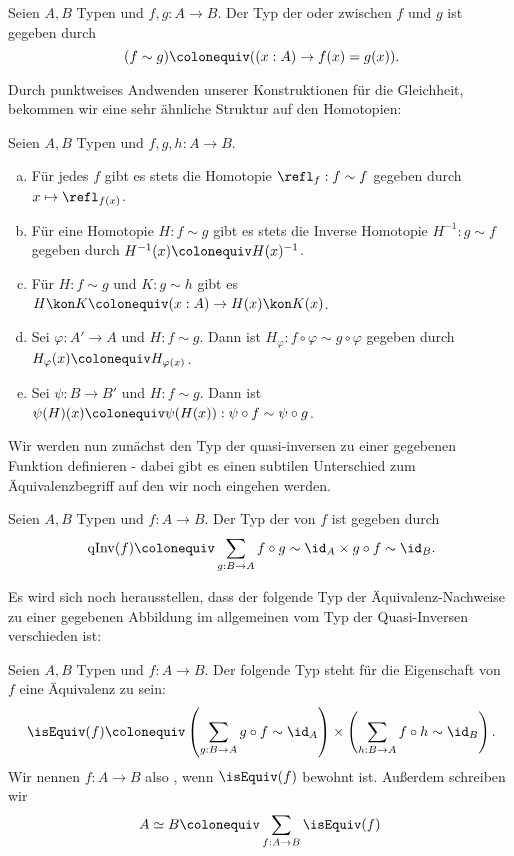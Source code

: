 \begin{definition}
  Seien $A,B$ Typen und $f,g:A\to B$.
  Der Typ der 
  oder  zwischen $f$ und $g$
  ist gegeben durch
  \[
    (f\sim g)\colonequiv( (x:A)\to f(x)=g(x))\rlap{.}
  \]
\end{definition}

Durch punktweises Andwenden unserer Konstruktionen für die Gleichheit,
bekommen wir eine sehr ähnliche Struktur auf den Homotopien:

\begin{definition}
  Seien $A,B$ Typen und $f,g,h:A\to B$.
  \begin{enumerate}[(a)]
  \item Für jedes $f$ gibt es stets die Homotopie $\refl_f:f\sim f$ gegeben durch $x\mapsto \refl_{f(x)}$.
  \item Für eine Homotopie $H:f\sim g$ gibt es stets die Inverse Homotopie $H^{-1}:g\sim f$ gegeben durch $H^{-1}(x)\colonequiv H(x)^{-1}$.
  \item Für $H:f\sim g$ und $K:g\sim h$ gibt es $H\kon K\colonequiv (x:A)\to H(x)\kon K(x)$.
  \item Sei $\varphi:A'\to A$ und $H:f\sim g$.
    Dann ist $H_\varphi:f\circ \varphi \sim g\circ \varphi$ gegeben durch $H_\varphi(x)\colonequiv H_{\varphi(x)}$.
  \item Sei $\psi:B\to B'$ und $H:f\sim g$. Dann ist $\psi(H)(x)\colonequiv \psi(H(x)):\psi\circ f\sim\psi\circ g$.
  \end{enumerate}
\end{definition}

Wir werden nun zunächst den Typ der quasi-inversen zu einer gegebenen Funktion definieren
- dabei gibt es einen subtilen Unterschied zum Äquivalenzbegriff auf den wir noch eingehen werden.

\begin{definition}
  Seien $A,B$ Typen und $f:A\to B$. Der Typ der  von $f$ ist gegeben durch
  \[
    \mathrm{qInv}(f)\colonequiv \sum_{g:B\to A} f\circ g\sim \id_A\times g\circ f\sim \id_B\rlap{.}
  \]
\end{definition}

Es wird sich noch herausstellen, dass der folgende Typ der Äquivalenz-Nachweise zu einer gegebenen Abbildung im allgemeinen vom Typ der Quasi-Inversen verschieden ist:

\begin{definition}
  Seien $A,B$ Typen und $f:A\to B$. Der folgende Typ steht für die Eigenschaft von $f$ eine Äquivalenz zu sein:
  \[
    \isEquiv(f) \colonequiv \left(\sum_{g:B\to A} g\circ f\sim\id_A \right)\times \left(\sum_{h:B\to A} f\circ h\sim\id_B\right)\rlap{.}
    \]
    Wir nennen $f:A\to B$ also , wenn $\isEquiv(f)$ bewohnt ist.
    Außerdem schreiben wir
    \[
      A\simeq B\colonequiv \sum_{f:A\to B}\isEquiv(f)
    \]
\end{definition}

